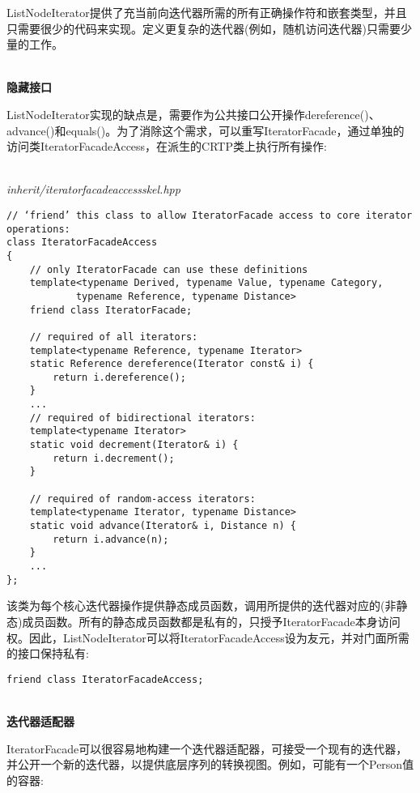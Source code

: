 ListNodeIterator提供了充当前向迭代器所需的所有正确操作符和嵌套类型，并且只需要很少的代码来实现。定义更复杂的迭代器(例如，随机访问迭代器)只需要少量的工作。

\hspace*{\fill} \\ %
\noindent
\textbf{隐藏接口}

ListNodeIterator实现的缺点是，需要作为公共接口公开操作dereference()、advance()和equals()。为了消除这个需求，可以重写IteratorFacade，通过单独的访问类IteratorFacadeAccess，在派生的CRTP类上执行所有操作:

\hspace*{\fill} \\ %
\noindent
\textit{inherit/iteratorfacadeaccessskel.hpp}
\begin{lstlisting}[style=styleCXX]
// ‘friend’ this class to allow IteratorFacade access to core iterator operations:
class IteratorFacadeAccess
{
	// only IteratorFacade can use these definitions
	template<typename Derived, typename Value, typename Category,
			typename Reference, typename Distance>
	friend class IteratorFacade;
	
	// required of all iterators:
	template<typename Reference, typename Iterator>
	static Reference dereference(Iterator const& i) {
		return i.dereference();
	}
	...
	// required of bidirectional iterators:
	template<typename Iterator>
	static void decrement(Iterator& i) {
		return i.decrement();
	}

	// required of random-access iterators:
	template<typename Iterator, typename Distance>
	static void advance(Iterator& i, Distance n) {
		return i.advance(n);
	}
	...
};
\end{lstlisting}

该类为每个核心迭代器操作提供静态成员函数，调用所提供的迭代器对应的(非静态)成员函数。所有的静态成员函数都是私有的，只授予IteratorFacade本身访问权。因此，ListNodeIterator可以将IteratorFacadeAccess设为友元，并对门面所需的接口保持私有:

\begin{lstlisting}[style=styleCXX]
friend class IteratorFacadeAccess;
\end{lstlisting}

\hspace*{\fill} \\ %
\noindent
\textbf{迭代器适配器}

IteratorFacade可以很容易地构建一个迭代器适配器，可接受一个现有的迭代器，并公开一个新的迭代器，以提供底层序列的转换视图。例如，可能有一个Person值的容器:

